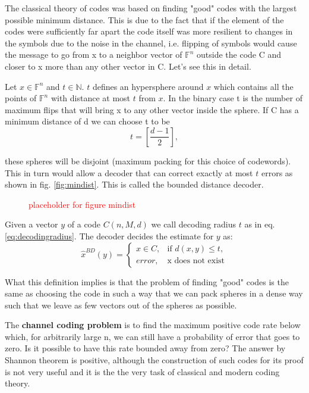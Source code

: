 The classical theory of codes was based on finding "good" codes with the largest possible minimum distance. This is due to the fact that if the element of the codes were sufficiently far apart the code itself was more resilient to changes in the symbols due to the noise in the channel, i.e. flipping of symbols would cause the message to go from x to a neighbor vector of $\mathbb{F}^n$ outside the code C and closer to x more than any other vector in C. Let's see this in detail. 

Let $x \in \mathbb{F}^n$ and $t \in \mathbb{N}$. $t$ defines an hypersphere around $x$ which contains all the points of $\mathbb{F}^n$ with distance at most $t$ from $x$. In the binary case t is the number of maximum flips that will bring x to any other vector inside the sphere. If C has a minimum distance of d we can choose t to be
\begin{equation}
t = \left[\frac{d-1}{2}\right],
\label{eq:decodingradius}
\end{equation} 

these spheres will be disjoint (maximum packing for this choice of codewords). This in turn would allow a decoder that can correct exactly at most $t$ errors as shown in fig. \ref{fig:mindist}. This is called the bounded distance decoder.

\begin{figure}[h]
	\textcolor{red}{placeholder for figure mindist}
\end{figure}

\begin{definition}
	Given a vector $y$ of a code $C(n,M,d)$ we call decoding radius $t$ as in eq.\ref{eq:decodingradius}. The decoder decides the estimate for $y$ as:
	\begin{equation}
	\hat{x}^{BD}(y) = 
	\begin{cases}
	x \in C, & \text{if } d(x,y) \le t, \\
	error,   & \text{x does not exist}
	\end{cases}
	\end{equation}
\end{definition}

What this definition implies is that the problem of finding "good" codes is the same as choosing the code in such a way that we can pack spheres in a dense way such that we leave as few vectors out of the spheres as possible. 

The \textbf{channel coding problem} is to find the maximum positive code rate below which, for arbitrarily large n, we can still have a probability of error that goes to zero. Is it possible to have this rate bounded away from zero? The answer by Shannon theorem is positive, although the construction of such codes for its proof is not very useful and it is the the very task of classical and modern coding theory.


